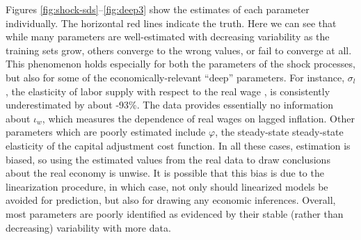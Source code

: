 \documentclass[11pt]{article}
\begin{document}
Figures \ref{fig:shock-sds}--\ref{fig:deep3} show the estimates of each
parameter individually. The horizontal red lines indicate the truth.
Here we can see that while many parameters are well-estimated with
decreasing variability as the training sets grow, others converge to the
wrong values, or fail to converge at all. This phenomenon holds
especially for both the parameters of the shock processes, but also for
some of the economically-relevant ``deep'' parameters. For instance,
\(\sigma_l\), the elasticity of labor supply with respect to the real
wage , is consistently underestimated by about -93\%. The data provides
essentially no information about \(\iota_w\), which measures the
dependence of real wages on lagged inflation. Other parameters which are
poorly estimated include \(\varphi\), the steady-state steady-state
elasticity of the capital adjustment cost function. In all these cases,
estimation is biased, so using the estimated values from the real data
to draw conclusions about the real economy is unwise. It is possible
that this bias is due to the linearization procedure, in which case, not
only should linearized models be avoided for prediction, but also for
drawing any economic inferences. Overall, most parameters are poorly
identified as evidenced by their stable (rather than decreasing)
variability with more data.
\end{document}
